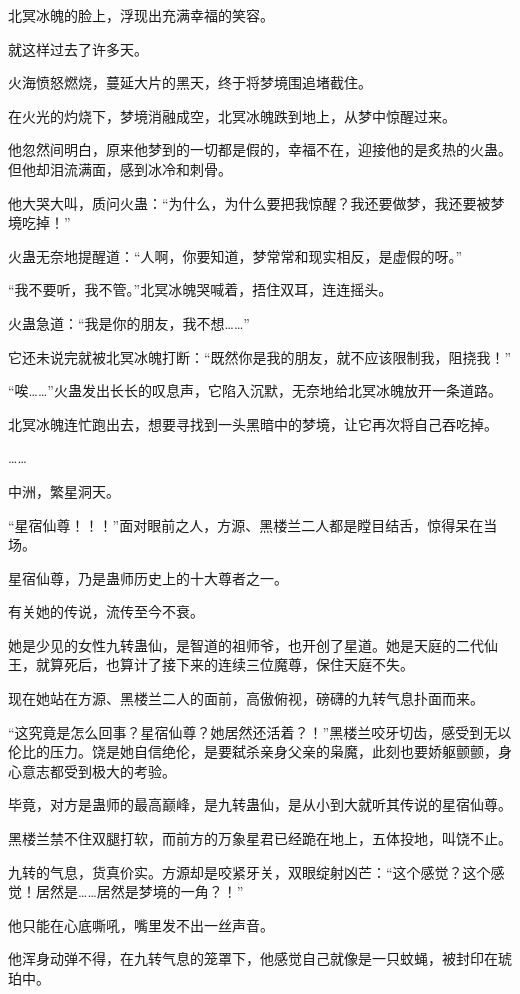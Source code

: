 \begin{this_body}
北冥冰魄的脸上，浮现出充满幸福的笑容。

就这样过去了许多天。

火海愤怒燃烧，蔓延大片的黑天，终于将梦境围追堵截住。

在火光的灼烧下，梦境消融成空，北冥冰魄跌到地上，从梦中惊醒过来。

他忽然间明白，原来他梦到的一切都是假的，幸福不在，迎接他的是炙热的火蛊。但他却泪流满面，感到冰冷和刺骨。

他大哭大叫，质问火蛊：“为什么，为什么要把我惊醒？我还要做梦，我还要被梦境吃掉！”

火蛊无奈地提醒道：“人啊，你要知道，梦常常和现实相反，是虚假的呀。”

“我不要听，我不管。”北冥冰魄哭喊着，捂住双耳，连连摇头。

火蛊急道：“我是你的朋友，我不想……”

它还未说完就被北冥冰魄打断：“既然你是我的朋友，就不应该限制我，阻挠我！”

“唉……”火蛊发出长长的叹息声，它陷入沉默，无奈地给北冥冰魄放开一条道路。

北冥冰魄连忙跑出去，想要寻找到一头黑暗中的梦境，让它再次将自己吞吃掉。

……

中洲，繁星洞天。

“星宿仙尊！！！”面对眼前之人，方源、黑楼兰二人都是瞠目结舌，惊得呆在当场。

星宿仙尊，乃是蛊师历史上的十大尊者之一。

有关她的传说，流传至今不衰。

她是少见的女性九转蛊仙，是智道的祖师爷，也开创了星道。她是天庭的二代仙王，就算死后，也算计了接下来的连续三位魔尊，保住天庭不失。

现在她站在方源、黑楼兰二人的面前，高傲俯视，磅礴的九转气息扑面而来。

“这究竟是怎么回事？星宿仙尊？她居然还活着？！”黑楼兰咬牙切齿，感受到无以伦比的压力。饶是她自信绝伦，是要弑杀亲身父亲的枭魔，此刻也要娇躯颤颤，身心意志都受到极大的考验。

毕竟，对方是蛊师的最高巅峰，是九转蛊仙，是从小到大就听其传说的星宿仙尊。

黑楼兰禁不住双腿打软，而前方的万象星君已经跪在地上，五体投地，叫饶不止。

九转的气息，货真价实。方源却是咬紧牙关，双眼绽射凶芒：“这个感觉？这个感觉！居然是……居然是梦境的一角？！”

他只能在心底嘶吼，嘴里发不出一丝声音。

他浑身动弹不得，在九转气息的笼罩下，他感觉自己就像是一只蚊蝇，被封印在琥珀中。


\end{this_body}
